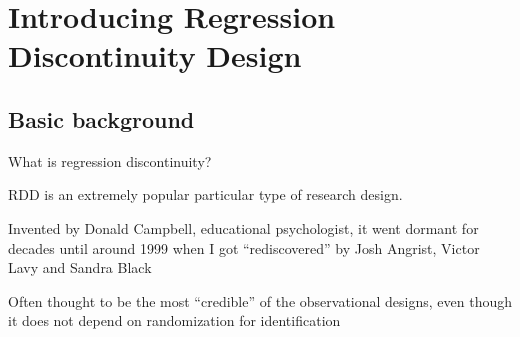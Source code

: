 \documentclass{beamer}
\begin{document}



\section{Introducing Regression Discontinuity Design}


\subsection{Basic background}



\begin{frame}{What is regression discontinuity?}

RDD is an extremely popular particular type of research design.  

\bigskip

Invented by Donald Campbell, educational psychologist, it went dormant for decades until around 1999 when I got ``rediscovered'' by Josh Angrist, Victor Lavy and Sandra Black

\bigskip

Often thought to be the most ``credible'' of the observational designs, even though it does not depend on randomization for identification

\end{frame}



\begin{frame}[plain]

	\begin{figure}
	\end{figure}

\end{frame}
\end{document}
